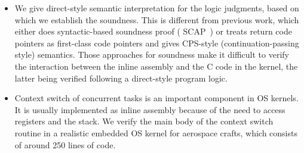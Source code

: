 \begin{itemize}
	\item
    We give direct-style semantic interpretation for
    the logic judgments, based on which we establish the
    soundness. This is different from previous
    work, which either does syntactic-based soundness proof
    (\eg{} SCAP~\cite{Feng06pldi}) or treats return code pointers
    as first-class code pointers and gives CPS-style 
    (continuation-passing style) semantics.
    Those approaches for soundness make it difficult to verify
    the interaction between the inline assembly and the C
    code in the kernel, the latter being verified following
    a direct-style program logic.
	
	
	\item
	Context switch of concurrent tasks is an important
    component in OS kernels. It is usually implemented
    as inline assembly because of the need to access
    registers and the stack.
	We verify the main body of the context switch routine
	in a realistic embedded OS kernel for aerospace crafts,
    which consists of around 250 lines of \sparc{} code.


\end{itemize}
